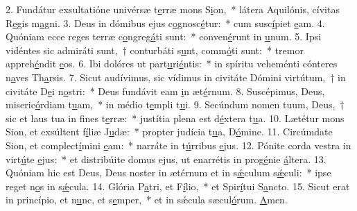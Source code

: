 2. Fundátur exsultatióne univérsæ t\uline{e}rræ mons S\uline{i}on,~* látera Aquilónis, cívitas R\uline{e}gis m\uline{a}gni.
3. Deus in dómibus ejus c\uline{o}gnosc\uline{é}tur:~* cum susc\uline{í}piet \uline{e}am.
4. Quóniam ecce reges terræ c\uline{o}ngreg\uline{á}ti sunt:~* conven\uline{é}runt in \uline{u}num.
5. Ipsi vidéntes sic admiráti sunt,~† conturbáti s\uline{u}nt, comm\uline{ó}ti sunt:~* tremor appreh\uline{é}ndit \uline{e}os.
6. Ibi dolóres ut part\uline{u}ri\uline{é}ntis:~* in spíritu veheménti cónteres n\uline{a}ves Th\uline{a}rsis.
7. Sicut audívimus, sic vídimus in civitáte Dómini virtútum,~† in civitáte D\uline{e}i n\uline{o}stri:~* Deus fundávit eam \uline{i}n æt\uline{é}rnum.
8. Suscépimus, Deus, miseric\uline{ó}rdiam t\uline{u}am,~* in médio t\uline{e}mpli t\uline{u}i.
9. Secúndum nomen tuum, Deus,~† sic et laus tua in f\uline{i}nes t\uline{e}rræ:~* justítia plena est d\uline{é}xtera t\uline{u}a.
10. Lætétur mons Sion, et exsúltent f\uline{í}liæ J\uline{u}dæ:~* propter judícia t\uline{u}a, D\uline{ó}mine.
11. Circúmdate Sion, et complect\uline{í}mini \uline{e}am:~* narráte in t\uline{ú}rribus \uline{e}jus.
12. Pónite corda vestra in virt\uline{ú}te \uline{e}jus:~* et distribúite domus ejus, ut enarrétis in prog\uline{é}nie \uline{á}ltera.
13. Quóniam hic est Deus, Deus noster in ætérnum et in s\uline{ǽ}culum s\uline{ǽ}culi:~* ipse reget n\uline{o}s in s\uline{ǽ}cula.
14. Glória P\uline{a}tri, et F\uline{í}lio,~* et Spir\uline{í}tui S\uline{a}ncto.
15. Sicut erat in princípio, et n\uline{u}nc, et s\uline{e}mper,~* et in sǽcula sæcul\uline{ó}rum. \uline{A}men.
